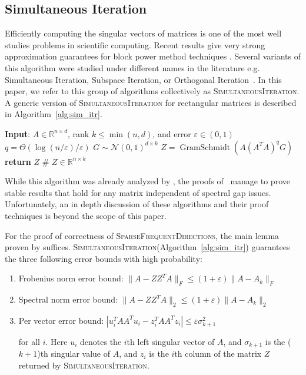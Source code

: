 \documentclass[11pt]{article}
\newcommand{\R}{\mathbb{R}}
\newcommand{\eps}{\varepsilon}
\newcommand{\sfd}{\textsc{SparseFrequentDirections}\xspace}
\newcommand{\si}{\textsc{SimultaneousIteration}\xspace}
\begin{document}
\subsection{Simultaneous  Iteration}
Efficiently computing the singular vectors of matrices is one of the most well studies problems in scientific computing.
Recent results give very strong approximation guarantees for block power method techniques \cite{rokhlin2009randomized}\cite{woolfe2008fast}\cite{liberty2007randomized}\cite{halko2011finding}. Several variants of this algorithm were studied under different names in the literature e.g. Simultaneous  Iteration, Subspace Iteration, or Orthogonal Iteration~\cite{golub2012matrix}. 
In this paper, we refer to this group of algorithms collectively as \si. 
A generic version of \si for rectangular matrices is described in Algorithm~\ref{alg:sim_itr}.
\begin{algorithm}[H]
\caption{\si}
\label{alg:sim_itr}
\begin{algorithmic}
\STATE \textbf{Input}: $A \in \R^{n \times d}$, rank $k \leq \min(n,d)$, and error $\eps\in(0,1)$
\STATE $q = \Theta(\log (n/\eps)/\eps)$
\STATE $G \sim \mathcal{N}(0,1)^{d\times k}$
\STATE $Z = \operatorname{GramSchmidt}(A(A^TA)^qG)$
\STATE \textbf{return} $Z$ \hfill \# $Z\in\R^{n\times k}$
\end{algorithmic}
\end{algorithm}

While this algorithm was already analyzed by \cite{golub2012matrix}, the proofs of~\cite{rokhlin2009randomized, halko2011finding, musco2015stronger, witten2013randomized} manage to prove stable results that hold for any matrix independent of spectral gap issues.
Unfortunately, an in depth discussion of these algorithms and their proof techniques is beyond the scope of this paper. 

For the proof of correctness of \sfd, the main lemma proven by \cite{musco2015stronger} suffices.
\si (Algorithm~\ref{alg:sim_itr}) guarantees the three following error bounds with high probability:
\begin{enumerate}
\item Frobenius norm error bound: 
$\|A-ZZ^TA\|_F \leq (1+\eps) \|A-A_k\|_F$
\item Spectral norm error bound: 
$\|A-ZZ^TA\|_2 \leq (1+\eps) \|A-A_k\|_2$
\item Per vector error bound: 
$|u_i^T AA^T u_i - z_i^T AA^T z_i| \leq \eps \sigma_{k+1}^2$

for all $i$. Here $u_i$ denotes the $i$th left singular vector of $A$, and $\sigma_{k+1}$ is the ($k+1$)th singular value of $A$, and $z_i$ is the $i$th column of the matrix $Z$ returned by \si.  
\end{enumerate}
\end{document}
